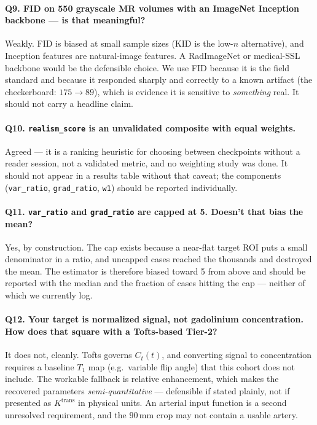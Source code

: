 \documentclass[11pt]{article}
\newcommand{\1}{\mathbb{1}}
\begin{document}
\paragraph{Q9. FID on 550 grayscale MR volumes with an ImageNet Inception backbone --- is that
meaningful?}
Weakly. FID is biased at small sample sizes (KID is the low-$n$ alternative), and Inception
features are natural-image features. A RadImageNet or medical-SSL backbone would be the
defensible choice. We use FID because it is the field standard and because it responded
sharply and correctly to a known artifact (the checkerboard: $175\to89$), which is evidence
it is sensitive to \emph{something} real. It should not carry a headline claim.

\paragraph{Q10. \texttt{realism\_score} is an unvalidated composite with equal weights.}
Agreed --- it is a ranking heuristic for choosing between checkpoints without a reader
session, not a validated metric, and no weighting study was done. It should not appear in a
results table without that caveat; the components (\texttt{var\_ratio}, \texttt{grad\_ratio},
\texttt{w1}) should be reported individually.

\paragraph{Q11. \texttt{var\_ratio} and \texttt{grad\_ratio} are capped at 5. Doesn't that
bias the mean?}
Yes, by construction. The cap exists because a near-flat target ROI puts a small denominator
in a ratio, and uncapped cases reached the thousands and destroyed the mean. The estimator is
therefore biased toward 5 from above and should be reported with the median and the fraction
of cases hitting the cap --- neither of which we currently log.

\paragraph{Q12. Your target is normalized signal, not gadolinium concentration. How does that
square with a Tofts-based Tier-2?}
It does not, cleanly. Tofts governs $C_t(t)$, and converting signal to concentration requires
a baseline $T_1$ map (e.g.\ variable flip angle) that this cohort does not include. The
workable fallback is relative enhancement, which makes the recovered parameters
\emph{semi-quantitative} --- defensible if stated plainly, not if presented as $K^{\text{trans}}$
in physical units. An arterial input function is a second unresolved requirement, and the
$90$\,mm crop may not contain a usable artery.
\end{document}

